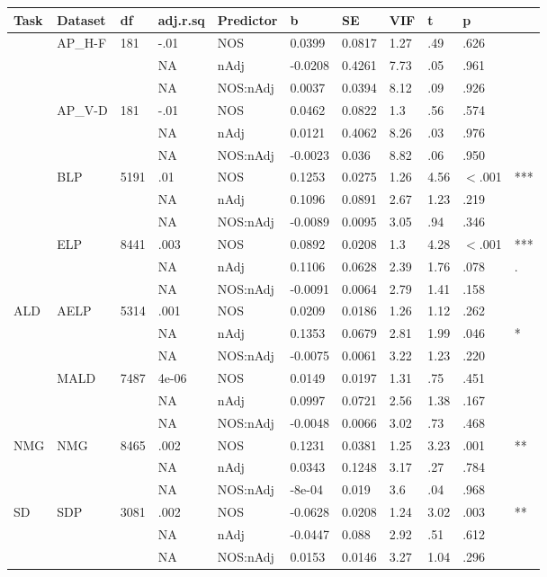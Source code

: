 \begin{table}[ht]
\centering
\begingroup\normalsize
\begin{tabular}{lllllllllll}
  \hline
Task & Dataset & df & adj.r.sq & Predictor & b & SE & VIF & t & p &  \\ 
  \hline
 & AP\_H-F & 181 & -.01 & NOS & 0.0399 & 0.0817 & 1.27 & .49 & .626 &   \\ 
   &  &  & NA & nAdj & -0.0208 & 0.4261 & 7.73 & .05 & .961 &   \\ 
   &  &  & NA & NOS:nAdj & 0.0037 & 0.0394 & 8.12 & .09 & .926 &   \\ 
   & AP\_V-D & 181 & -.01 & NOS & 0.0462 & 0.0822 & 1.3 & .56 & .574 &   \\ 
   &  &  & NA & nAdj & 0.0121 & 0.4062 & 8.26 & .03 & .976 &   \\ 
   &  &  & NA & NOS:nAdj & -0.0023 & 0.036 & 8.82 & .06 & .950 &   \\ 
   & BLP & 5191 & .01 & NOS & 0.1253 & 0.0275 & 1.26 & 4.56 & $<$.001 & *** \\ 
   &  &  & NA & nAdj & 0.1096 & 0.0891 & 2.67 & 1.23 & .219 &   \\ 
   &  &  & NA & NOS:nAdj & -0.0089 & 0.0095 & 3.05 & .94 & .346 &   \\ 
   & ELP & 8441 & .003 & NOS & 0.0892 & 0.0208 & 1.3 & 4.28 & $<$.001 & *** \\ 
   &  &  & NA & nAdj & 0.1106 & 0.0628 & 2.39 & 1.76 & .078 & . \\ 
   &  &  & NA & NOS:nAdj & -0.0091 & 0.0064 & 2.79 & 1.41 & .158 &   \\ 
  ALD & AELP & 5314 & .001 & NOS & 0.0209 & 0.0186 & 1.26 & 1.12 & .262 &   \\ 
   &  &  & NA & nAdj & 0.1353 & 0.0679 & 2.81 & 1.99 & .046 & * \\ 
   &  &  & NA & NOS:nAdj & -0.0075 & 0.0061 & 3.22 & 1.23 & .220 &   \\ 
   & MALD & 7487 & 4e-06 & NOS & 0.0149 & 0.0197 & 1.31 & .75 & .451 &   \\ 
   &  &  & NA & nAdj & 0.0997 & 0.0721 & 2.56 & 1.38 & .167 &   \\ 
   &  &  & NA & NOS:nAdj & -0.0048 & 0.0066 & 3.02 & .73 & .468 &   \\ 
  NMG & NMG & 8465 & .002 & NOS & 0.1231 & 0.0381 & 1.25 & 3.23 & .001 & ** \\ 
   &  &  & NA & nAdj & 0.0343 & 0.1248 & 3.17 & .27 & .784 &   \\ 
   &  &  & NA & NOS:nAdj & -8e-04 & 0.019 & 3.6 & .04 & .968 &   \\ 
  SD & SDP & 3081 & .002 & NOS & -0.0628 & 0.0208 & 1.24 & 3.02 & .003 & ** \\ 
   &  &  & NA & nAdj & -0.0447 & 0.088 & 2.92 & .51 & .612 &   \\ 
   &  &  & NA & NOS:nAdj & 0.0153 & 0.0146 & 3.27 & 1.04 & .296 &   \\ 
   \hline
\end{tabular}
\endgroup
\end{table}
